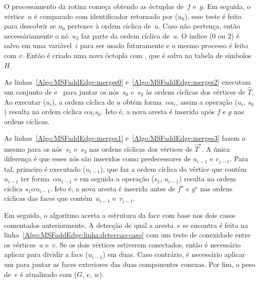 O processamento da rotina \MSFaddEdge{} começa obtendo as óctuplas de~$f$ e~$g$.
Em seguida, o vértice~$u$ é comparado com identificador retornado por \LCOFindNode($u_{0}$), esse teste é feito para descobrir se $u_{0}$ pertence à ordem cíclica de~$u$.
Caso não pertença, então necessáriamente o nó~$u_2$ faz parte da ordem cíclica de~$u$.
O índice ($0$ ou $2$) é salvo em uma variável~$i$ para ser usado futuramente e o mesmo processo é feito com $v$.
Então é criado uma nova óctopla com \LCOMakeOcto{}, que é salva na tabela de símbolos~$H$.


As linhas~\ref{Algo:MSFaddEdge:merges0} e~\ref{Algo:MSFaddEdge:merges2} executam um conjunto de \LCOCycle{} e~\LCOMerge{} para juntar os nós~$s_0$ e~$s_2$ às ordens cíclicas dos vértices de $\hat T$.  
Ao executar \LCOCycle($u_i$), a ordem cíclica de $u$ obtém forma~$\alpha u_i$, assim a operação \LCOMerge($u_i$, $s_0$) resulta na ordem cíclica $\alpha u_is_0$.
Isto é, a nova aresta é inserida após $f$ e $g$ nas ordens cíclicas.

As linhas~\ref{Algo:MSFaddEdge:merges1} e~\ref{Algo:MSFaddEdge:merges3} fazem o mesmo para os nós~$s_1$ e~$s_3$ nas ordens cíclicas dos vértices de $\hat T^\star$.  
A única diferença é que esses nós são inseridos como predecessores de $u_{i-1}$ e $v_{j-1}$.
Para tal, primeiro é executado \LCOCycle($u_{i-1}$), que faz a ordem cíclica do vértice que contém $u_{i-1}$ ter forma~$\alpha u_{i-1}$ e em seguida a operação \LCOMerge($s_1$, $u_{i-1}$) resulta na ordem cíclica $s_1 \alpha u_{i-1}$.
Isto é, a nova aresta é inserida antes de $f^\star$ e $g^\star$ nas ordens cíclicas das faces que contém~$u_{i-1}$ e~$v_{i-1}$.

Em seguida, o algoritmo acerta a estrutura da face com base nos dois casos comentados anteriormente.
A detecção de qual a aresta~$e$ se encontra é feita na linha~\ref{Algo:MSFaddEdge:linha:deteccao-caso} com um teste de conexidade entre os vértices~$u$ e~$v$.
Se os dois vértices estiverem conectados, então é necessário aplicar \LCOSplit{} para dividir a face \LCOFindNode($u_{i-1}$) em duas.
Caso contrário, é necessário aplicar um \LCOMerge para juntar as faces exteriores das duas componentes conexas.
Por fim, o peso de~$e$ é atualizado com \MSFupdate($G$, $e$, $w$).

